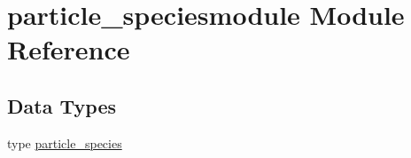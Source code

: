 \hypertarget{namespaceparticle__speciesmodule}{}\section{particle\+\_\+speciesmodule Module Reference}
\label{namespaceparticle__speciesmodule}
\subsection*{Data Types}
\begin{DoxyCompactItemize}
\item 
type \hyperlink{structparticle__speciesmodule_1_1particle__species}{particle\+\_\+species}
\end{DoxyCompactItemize}
